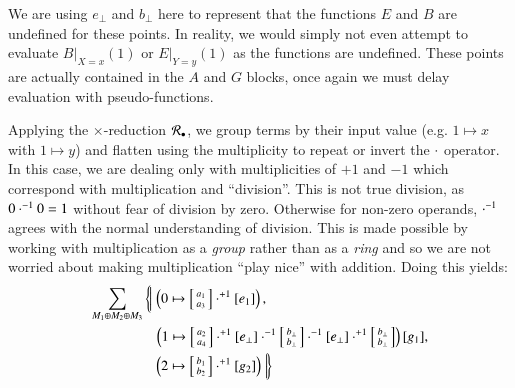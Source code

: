 We are using $e_\bot$ and $b_\bot$ here to represent that the functions $E$ and $B$ are undefined for these points.
In reality, we would simply not even attempt to evaluate $B|_{X=x}(1)$ or $E|_{Y=y}(1)$ as the functions are undefined.
These points are actually contained in the $A$ and $G$ blocks, once again we must delay evaluation with pseudo-functions.


Applying the $\times$-reduction $\R[\smallmult]$, we group terms by their input value (e.g. $1 \mapsto x$ with $1 \mapsto y$) 
and flatten using the multiplicity to repeat or invert the $\mult$ operator.
In this case, we are dealing only with multiplicities of $+1$ and $-1$ which correspond with multiplication and ``division''.
This is not true division, as $0 \mult^{-1} 0 = 1$ without fear of division by zero.
Otherwise for non-zero operands, $\mult^{-1}$ agrees with the normal understanding of division.
This is made possible by working with multiplication as a \emph{group} rather than as a \emph{ring}
and so we are not worried about making multiplication ``play nice'' with addition.
Doing this yields:
\begin{align*}
	\sum_{M_1 \oplus M_2 \oplus M_3}
		& \left\{\!\left|\; \left(0 \mapsto 
			\left[\begin{smallmatrix}\vphantom{b}a_1 \\ \vphantom{b}a_3 \end{smallmatrix}\right] \mult^{+1} 
			[e_1] \right), \right.\right.\\
		&\;\;\;\left(1 \mapsto 
			\left[\begin{smallmatrix}\vphantom{b}a_2 \\ \vphantom{b}a_4 \end{smallmatrix}\right] \mult^{+1}
			[e_\bot] \mult^{-1}
			\left[\begin{smallmatrix} b_\bot \\ b_\bot \end{smallmatrix}\right] \mult^{-1}
			[ e_\bot ]\mult^{+1}
			\left[ \begin{smallmatrix} b_\bot \\ b_\bot \end{smallmatrix} \right] \right)
			[ g_1 ],\\
		&\;\;\left.\left.\left(2 \mapsto 
			\left[ \begin{smallmatrix} b_1 \\ b_2 \end{smallmatrix}\right]\mult^{+1}
			[ g_2 ] \right) \; \right|\!\right\}
\end{align*}


